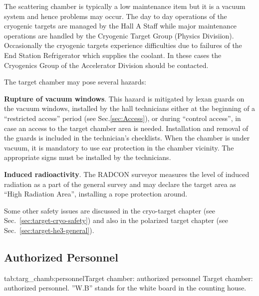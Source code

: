The scattering chamber is typically a low maintenance item but it is a vacuum
system and hence problems may occur. The day to day operations of the cryogenic
targets are managed by the Hall A Staff while major maintenance operations are
handled by the Cryogenic Target Group (Physics Divisiion). Occasionally the
cryogenic targets experience difficulties due to failures of the End Station
Refrigerator which supplies the coolant. In these cases the Cryogenics Group
of the Accelerator Division should be contacted.

\noindent{}The target chamber may pose several hazards:

\begin{list}{.~}{\setlength{\itemsep}{-0.15cm}}
  \item {\bf Rupture of vacuum windows}. This hazard is mitigated by
        lexan guards on the vacuum windows, installed by the hall technicians
        either at the beginning of a ``restricted access'' period (see Sec.\ref{sec:Access}),
        or during ``control access'', in case an access to the target chamber area is needed.
        Installation and removal of the guards is included in the technician's checklists.
        When the chamber is under vacuum, it is mandatory to use ear protection in the chamber
        vicinity. The appropriate signs must be installed by the technicians. 

  \item {\bf Induced radioactivity}. The RADCON surveyor measures the level of induced
        radiation as a part of the general survey and may declare the target area 
        as ``High Radiation Area'', installing a rope protection around\cite{RWIcebaf}. 

\end{list}

Some other safety issues are discussed in the cryo-target chapter 
(see Sec.~\ref{sec:target-cryo-safety}) and also in the polarized target
chapter (see Sec.~\ref{sec:target-he3-general}).

\begin{safetyen}{10}{15}
\section[Authorized  Personnel]{Authorized  Personnel}
\end{safetyen}

\begin{namestab}{tab:targ_chamb:personnel}{Target chamber: authorized personnel}{%
      Target chamber: authorized personnel. ''W.B'' stands for the white board 
      in the counting house.}
  \EdFolts{}
  \DaveMeekins{}
  \JianPingChen{}
\end{namestab}

